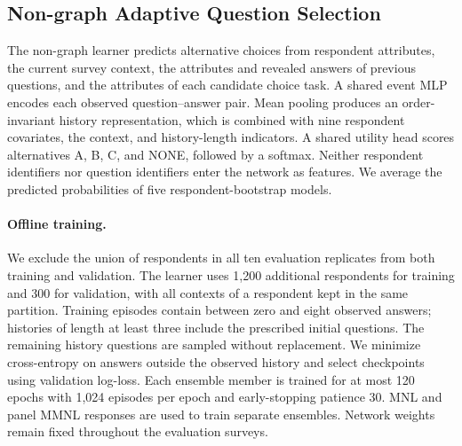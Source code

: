 \subsection{Non-graph Adaptive Question Selection}

The non-graph learner predicts alternative choices from respondent attributes,
the current survey context, the attributes and revealed answers of previous
questions, and the attributes of each candidate choice task. A shared event MLP
encodes each observed question--answer pair. Mean pooling produces an
order-invariant history representation, which is combined with nine respondent
covariates, the context, and history-length indicators. A shared utility head
scores alternatives A, B, C, and NONE, followed by a softmax. Neither respondent
identifiers nor question identifiers enter the network as features. We average
the predicted probabilities of five respondent-bootstrap models.

\paragraph{Offline training.}
We exclude the union of respondents in all ten evaluation replicates from both
training and validation. The learner uses 1,200 additional respondents for
training and 300 for validation, with all contexts of a respondent kept in the
same partition. Training episodes contain between zero and eight observed
answers; histories of length at least three include the prescribed initial
questions. The remaining history questions are sampled without replacement.
We minimize cross-entropy on answers outside the observed history and select
checkpoints using validation log-loss. Each ensemble member is trained for at
most 120 epochs with 1,024 episodes per epoch and early-stopping patience 30.
MNL and panel MMNL responses are used to train separate ensembles. Network
weights remain fixed throughout the evaluation surveys.

